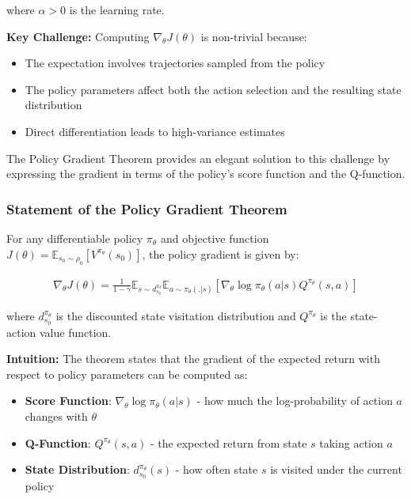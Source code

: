 where $\alpha > 0$ is the learning rate.

\textbf{Key Challenge:} Computing $\nabla_\theta J(\theta)$ is non-trivial because:
\begin{itemize}
    \item The expectation involves trajectories sampled from the policy
    \item The policy parameters affect both the action selection and the resulting state distribution
    \item Direct differentiation leads to high-variance estimates
\end{itemize}

The Policy Gradient Theorem provides an elegant solution to this challenge by expressing the gradient in terms of the policy's score function and the Q-function.

\subsubsection{Statement of the Policy Gradient Theorem}

\begin{theorem}
For any differentiable policy $\pi_\theta$ and objective function $J(\theta) = \mathbb{E}_{s_0 \sim \rho_0} [V^{\pi_\theta}(s_0)]$, the policy gradient is given by:

\begin{align}\label{policy_grad}
    \nabla_\theta J(\theta) = \frac{1}{1-\gamma}\mathbb{E}_{s \sim d^{\pi_\theta}_{s_0}}\mathbb{E}_{a \sim \pi_\theta(.|s)} [\nabla_\theta \log \pi_\theta (a|s) Q^{\pi_\theta} (s, a)]
\end{align}

where $d^{\pi_\theta}_{s_0}$ is the discounted state visitation distribution and $Q^{\pi_\theta}$ is the state-action value function.
\end{theorem}

\textbf{Intuition:}
The theorem states that the gradient of the expected return with respect to policy parameters can be computed as:
\begin{itemize}
    \item \textbf{Score Function}: $\nabla_\theta \log \pi_\theta(a|s)$ - how much the log-probability of action $a$ changes with $\theta$
    \item \textbf{Q-Function}: $Q^{\pi_\theta}(s,a)$ - the expected return from state $s$ taking action $a$
    \item \textbf{State Distribution}: $d^{\pi_\theta}_{s_0}(s)$ - how often state $s$ is visited under the current policy
\end{itemize}

